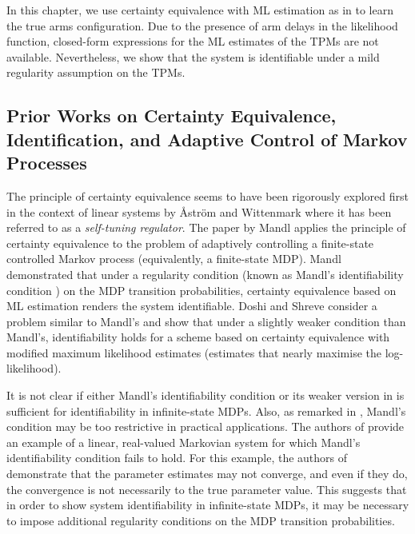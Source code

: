 In this chapter, we use certainty equivalence with ML estimation as in \cite{borkar1982identification} to learn the true arms configuration. Due to the presence of arm delays in the likelihood function, closed-form expressions for the ML estimates of the TPMs are not available. Nevertheless, we show that the system is identifiable under a mild regularity assumption on the TPMs.

\subsection{Prior Works on Certainty Equivalence, Identification, and Adaptive Control of Markov Processes}
The principle of certainty equivalence seems to have been rigorously explored first in the context of linear systems by \r{A}str\"{o}m and Wittenmark \cite{aastrom1973self} where it has been referred to as a {\em self-tuning regulator}. The paper by Mandl \cite{mandl1974estimation} applies the principle of certainty equivalence to the problem of adaptively controlling a finite-state controlled Markov process (equivalently, a finite-state MDP). Mandl demonstrated that under a regularity condition (known as Mandl's identifiability condition \cite[Eq. (35)]{mandl1974estimation}) on the MDP transition probabilities, certainty equivalence based on ML estimation renders the system identifiable. Doshi and Shreve \cite{doshi1980strong} consider a problem similar to Mandl's and show that under a slightly weaker condition than Mandl's, identifiability holds for a scheme based on certainty equivalence with modified maximum likelihood estimates (estimates that nearly maximise the log-likelihood).

It is not clear if either Mandl's identifiability condition or its weaker version in \cite{doshi1980strong} is sufficient for identifiability in infinite-state MDPs. Also, as remarked in \cite{borkar1979adaptive}, Mandl's condition may be too restrictive in practical applications. The authors of \cite{borkar1979adaptive} provide an example of a linear, real-valued Markovian system for which Mandl's identifiability condition fails to hold. For this example, the authors of \cite{borkar1979adaptive}  demonstrate that the parameter estimates may not converge, and even if they do, the convergence is not necessarily to the true parameter value. This suggests that in order to show system identifiability in infinite-state MDPs, it may be necessary to impose additional regularity conditions on the MDP transition probabilities.

